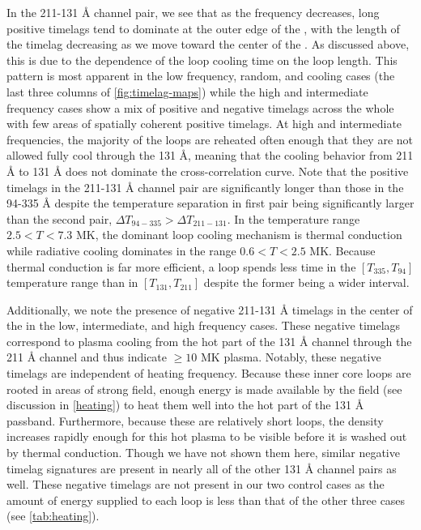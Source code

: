 In the 211-131 \AA{} channel pair, we see that as the frequency decreases, long positive timelags tend to dominate at the outer edge of the \AR{}, with the length of the timelag decreasing as we move toward the center of the \AR{}. As discussed above, this is due to the dependence of the loop cooling time on the loop length. This pattern is most apparent in the low frequency, random, and cooling cases (the last three columns of \autoref{fig:timelag-maps}) while the high and intermediate frequency cases show a mix of positive and negative timelags across the whole \AR{} with few areas of spatially coherent positive timelags. At high and intermediate frequencies, the majority of the loops are reheated often enough that they are not allowed fully cool through the 131 \AA{}, meaning that the cooling behavior from 211 \AA{} to 131 \AA{} does not dominate the cross-correlation curve. Note that the positive timelags in the 211-131 \AA{} channel pair are significantly longer than those in the 94-335 \AA{} despite the temperature separation in first pair being significantly larger than the second pair, $\Delta T_{94-335}>\Delta T_{211-131}$. In the temperature range $2.5<T<7.3$ MK, the dominant loop cooling mechanism is thermal conduction while radiative cooling dominates in the range $0.6<T<2.5$ MK. Because thermal conduction is far more efficient, a loop spends less time in the $[T_{335},T_{94}]$ temperature range than in $[T_{131},T_{211}]$ despite the former being a wider interval.

Additionally, we note the presence of negative 211-131 \AA{} timelags in the center of the \AR{} in the low, intermediate, and high frequency cases. These negative timelags correspond to plasma cooling from the hot part of the 131 \AA{} channel through the 211 \AA{} channel and thus indicate  $\ge10$ MK plasma. Notably, these negative timelags are independent of heating frequency. Because these inner core loops are rooted in areas of strong field, enough energy is made available by the field (see discussion in \autoref{heating}) to heat  them well into the hot part of the 131 \AA{} passband. Furthermore, because these are relatively short loops, the density increases rapidly enough for this hot plasma to be visible before it is washed out by thermal conduction. Though we have not shown them here, similar negative timelag signatures are present in nearly all of the other 131 \AA{} channel pairs as well. These negative timelags are not present in our two control cases as the amount of energy supplied to each loop is less than that of the other three cases (see \autoref{tab:heating}).

